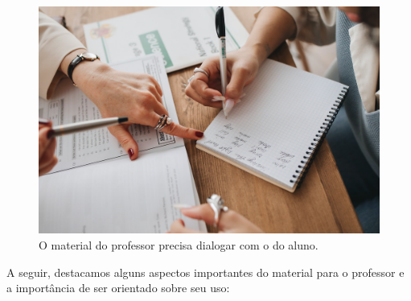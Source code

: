 \begin{figure}
\centering
\includegraphics[width=\textwidth]{./imgs/Imagem010.jpg}
\caption{O material do professor precisa dialogar com o do aluno.}
\end{figure}

A seguir, destacamos alguns aspectos importantes do material para o
professor e a importância de ser orientado sobre seu uso:

